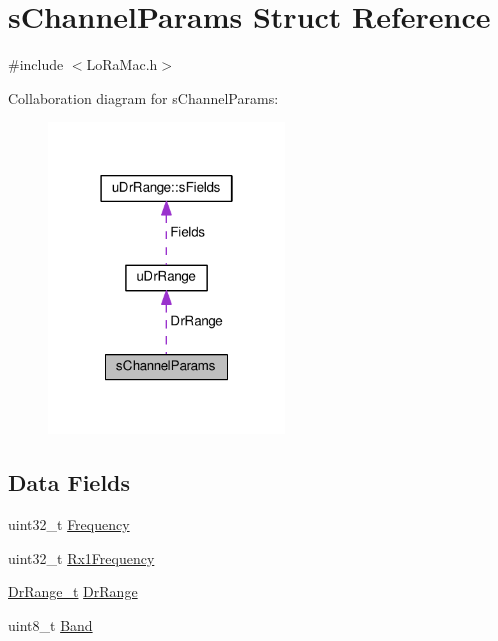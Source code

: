 \hypertarget{structsChannelParams}{}\section{s\+Channel\+Params Struct Reference}
\label{structsChannelParams}


{\ttfamily \#include $<$Lo\+Ra\+Mac.\+h$>$}



Collaboration diagram for s\+Channel\+Params\+:
\nopagebreak
\begin{figure}[H]
\begin{center}
\leavevmode
\includegraphics[width=178pt]{structsChannelParams__coll__graph}
\end{center}
\end{figure}
\subsection*{Data Fields}
\begin{DoxyCompactItemize}
\item 
uint32\+\_\+t \hyperlink{structsChannelParams_a3fe5b74bdc28e6388d7e7432a44c39ca}{Frequency}
\item 
uint32\+\_\+t \hyperlink{structsChannelParams_aa8e9aa5d1a595128d8341fd53192dd00}{Rx1\+Frequency}
\item 
\hyperlink{group__LORAMAC_ga8b818a36013d6bdd83ac5fd20f42b503}{Dr\+Range\+\_\+t} \hyperlink{structsChannelParams_a857777f73b0ad0bfd13e7b11d6bfa554}{Dr\+Range}
\item 
uint8\+\_\+t \hyperlink{structsChannelParams_a10517040b4151537ba6cec7783576ce0}{Band}
\end{DoxyCompactItemize}


